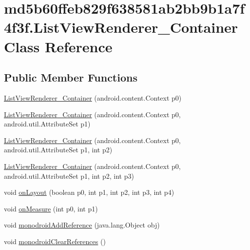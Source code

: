 \hypertarget{classmd5b60ffeb829f638581ab2bb9b1a7f4f3f_1_1_list_view_renderer___container}{
\section{md5b60ffeb829f638581ab2bb9b1a7f4f3f.ListViewRenderer\_\-Container Class Reference}
\label{classmd5b60ffeb829f638581ab2bb9b1a7f4f3f_1_1_list_view_renderer___container}
}
\subsection*{Public Member Functions}
\begin{CompactItemize}
\item 
\hyperlink{classmd5b60ffeb829f638581ab2bb9b1a7f4f3f_1_1_list_view_renderer___container_960e9091cd0ede6811fa2f774ac998a3}{ListViewRenderer\_\-Container} (android.content.Context p0)
\item 
\hyperlink{classmd5b60ffeb829f638581ab2bb9b1a7f4f3f_1_1_list_view_renderer___container_079f089bf8a9f4a35ec59ce04abb3d98}{ListViewRenderer\_\-Container} (android.content.Context p0, android.util.AttributeSet p1)
\item 
\hyperlink{classmd5b60ffeb829f638581ab2bb9b1a7f4f3f_1_1_list_view_renderer___container_f8b2fbe4aa6217fcb86a29f17c80199b}{ListViewRenderer\_\-Container} (android.content.Context p0, android.util.AttributeSet p1, int p2)
\item 
\hyperlink{classmd5b60ffeb829f638581ab2bb9b1a7f4f3f_1_1_list_view_renderer___container_2b3ef6ca6e9196714d957f000cff52e3}{ListViewRenderer\_\-Container} (android.content.Context p0, android.util.AttributeSet p1, int p2, int p3)
\item 
void \hyperlink{classmd5b60ffeb829f638581ab2bb9b1a7f4f3f_1_1_list_view_renderer___container_b2f05621c7c998e3bdbfbef1a0e32fad}{onLayout} (boolean p0, int p1, int p2, int p3, int p4)
\item 
void \hyperlink{classmd5b60ffeb829f638581ab2bb9b1a7f4f3f_1_1_list_view_renderer___container_9ef651c952dc03df56f4c0fbe827df8d}{onMeasure} (int p0, int p1)
\item 
void \hyperlink{classmd5b60ffeb829f638581ab2bb9b1a7f4f3f_1_1_list_view_renderer___container_d6e3e1a3e209add1fbe6dcc4c6971ba7}{monodroidAddReference} (java.lang.Object obj)
\item 
void \hyperlink{classmd5b60ffeb829f638581ab2bb9b1a7f4f3f_1_1_list_view_renderer___container_e29fb9368e6d471c74594d384760ab12}{monodroidClearReferences} ()
\end{CompactItemize}
